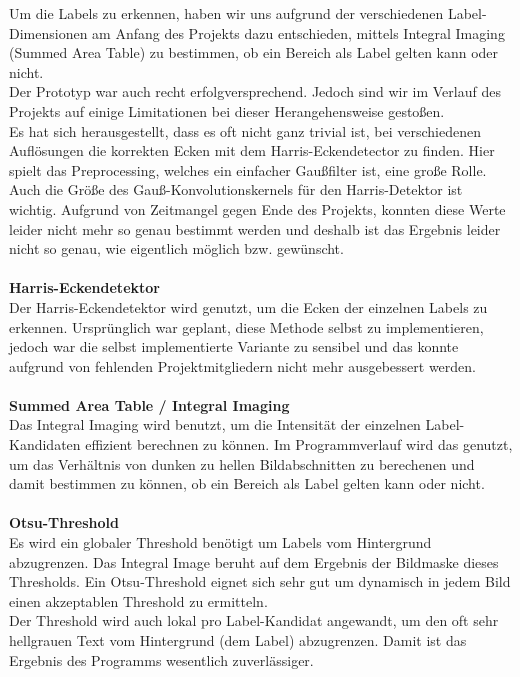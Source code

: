 \documentclass[paper=A4, deutsch]{scrartcl}
\begin{document}
Um die Labels zu erkennen, haben wir uns aufgrund der verschiedenen Label-Dimensionen am Anfang des Projekts dazu entschieden, mittels Integral Imaging (Summed Area Table) zu bestimmen, ob ein Bereich als Label gelten kann oder nicht.\\
Der Prototyp war auch recht erfolgversprechend. Jedoch sind wir im Verlauf des Projekts auf einige Limitationen bei dieser Herangehensweise gestoßen.\\
Es hat sich herausgestellt, dass es oft nicht ganz trivial ist, bei verschiedenen Auflösungen die korrekten Ecken mit dem Harris-Eckendetector zu finden. Hier spielt das Preprocessing, welches ein einfacher Gaußfilter ist, eine große Rolle. Auch die Größe des Gauß-Konvolutionskernels für den Harris-Detektor ist wichtig. Aufgrund von Zeitmangel gegen Ende des Projekts, konnten diese Werte leider nicht mehr so genau bestimmt werden und deshalb ist das Ergebnis leider nicht so genau, wie eigentlich möglich bzw. gewünscht.\\
\\
\textbf{Harris-Eckendetektor} \cite{harris}\\
Der Harris-Eckendetektor wird genutzt, um die Ecken der einzelnen Labels zu erkennen.
Ursprünglich war geplant, diese Methode selbst zu implementieren, jedoch war die selbst implementierte Variante zu sensibel und das konnte aufgrund von fehlenden Projektmitgliedern nicht mehr ausgebessert werden.\\
\\
\textbf{Summed Area Table / Integral Imaging} \cite{integralimg}\\
Das Integral Imaging wird benutzt, um die Intensität der einzelnen Label-Kandidaten effizient berechnen zu können. Im Programmverlauf wird das genutzt, um das Verhältnis von dunken zu hellen Bildabschnitten zu berechenen und damit bestimmen zu können, ob ein Bereich als Label gelten kann oder nicht.\\
\\
\textbf{Otsu-Threshold} \cite{otsu}\\
Es wird ein globaler Threshold benötigt um Labels vom Hintergrund abzugrenzen. Das Integral Image beruht auf dem Ergebnis der Bildmaske dieses Thresholds. Ein Otsu-Threshold eignet sich sehr gut um dynamisch in jedem Bild einen akzeptablen Threshold zu ermitteln.\\
Der Threshold wird auch lokal pro Label-Kandidat angewandt, um den oft sehr hellgrauen Text vom Hintergrund (dem Label) abzugrenzen. Damit ist das Ergebnis des Programms wesentlich zuverlässiger.
\end{document}
